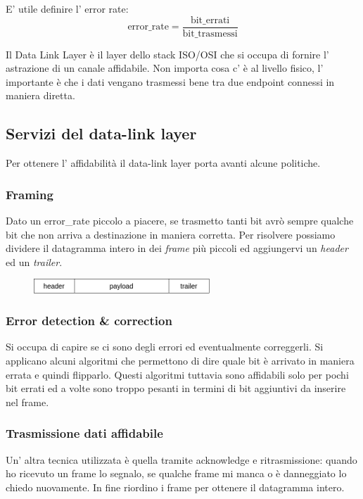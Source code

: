 E' utile definire l' error rate:
$$ \text{error\_rate} = \frac{\text{bit\_errati}}{\text{bit\_trasmessi}} $$

Il Data Link Layer è il layer dello stack ISO/OSI che si occupa di fornire l' astrazione di un canale affidabile.
Non importa cosa c' è al livello fisico, l' importante è che i dati vengano trasmessi bene tra due endpoint connessi in maniera diretta.



\subsection{Servizi del data-link layer}
Per ottenere l' affidabilità il data-link layer porta avanti alcune politiche.

\subsubsection{Framing}
Dato un error\_rate piccolo a piacere, se trasmetto tanti bit avrò sempre qualche bit che non arriva a destinazione in maniera corretta.
Per risolvere possiamo dividere il datagramma intero in dei \emph{frame} più piccoli ed aggiungervi un \emph{header} ed un \emph{trailer}.
\begin{figure}[H]
    \centering
    \includegraphics[width=250px]{images/3_Reti_connessione_diretta/frame.png}
\end{figure}

\subsubsection{Error detection \& correction}
Si occupa di capire se ci sono degli errori ed eventualmente correggerli.
Si applicano alcuni algoritmi che permettono di dire quale bit è arrivato in maniera errata e quindi flipparlo.
Questi algoritmi tuttavia sono affidabili solo per pochi bit errati ed a volte sono troppo pesanti in termini di bit aggiuntivi da inserire nel frame.

\subsubsection{Trasmissione dati affidabile}
Un' altra tecnica utilizzata è quella tramite acknowledge e ritrasmissione: quando ho ricevuto un frame lo segnalo, se qualche frame mi manca o è danneggiato lo chiedo nuovamente.
In fine riordino i frame per ottenere il datagramma intero.


